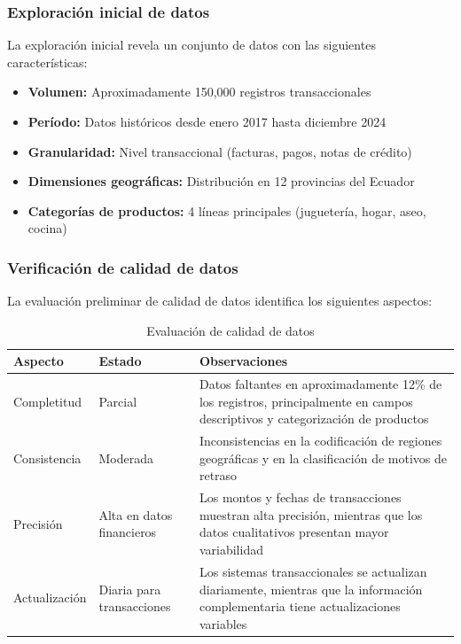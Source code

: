 \subsubsection{Exploración inicial de datos}
La exploración inicial revela un conjunto de datos con las siguientes características:

\begin{itemize}
    \item \textbf{Volumen:} Aproximadamente 150,000 registros transaccionales
    \item \textbf{Período:} Datos históricos desde enero 2017 hasta diciembre 2024
    \item \textbf{Granularidad:} Nivel transaccional (facturas, pagos, notas de crédito)
    \item \textbf{Dimensiones geográficas:} Distribución en 12 provincias del Ecuador
    \item \textbf{Categorías de productos:} 4 líneas principales (juguetería, hogar, aseo, cocina)
\end{itemize}

\subsubsection{Verificación de calidad de datos}
La evaluación preliminar de calidad de datos identifica los siguientes aspectos:

\begin{table}[ht]
\centering
\begin{tabular}{|p{4cm}|p{3cm}|p{7cm}|}
\hline
\textbf{Aspecto} & \textbf{Estado} & \textbf{Observaciones} \\
\hline
Completitud & Parcial & Datos faltantes en aproximadamente 12\% de los registros, principalmente en campos descriptivos y categorización de productos \\
\hline
Consistencia & Moderada & Inconsistencias en la codificación de regiones geográficas y en la clasificación de motivos de retraso \\
\hline
Precisión & Alta en datos financieros & Los montos y fechas de transacciones muestran alta precisión, mientras que los datos cualitativos presentan mayor variabilidad \\
\hline
Actualización & Diaria para transacciones & Los sistemas transaccionales se actualizan diariamente, mientras que la información complementaria tiene actualizaciones variables \\
\hline
\end{tabular}
\caption{Evaluación de calidad de datos}
\end{table}


